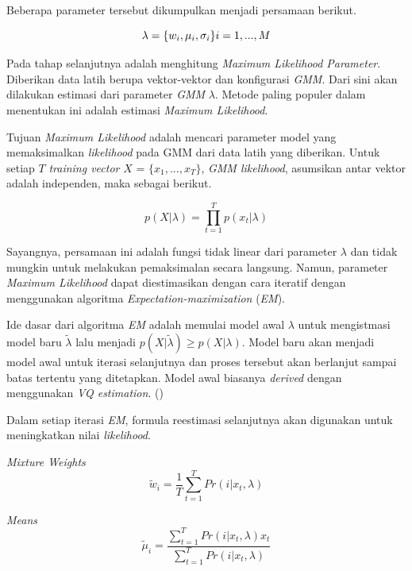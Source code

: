 Beberapa parameter tersebut dikumpulkan menjadi persamaan berikut.

\begin{equation}
    \label{eq:lambda_gaussian_mixture_model}
    \lambda = \{w_i, \mu_i, \sigma_i\} \\
    i = 1, ..., M
\end{equation}

Pada tahap selanjutnya adalah menghitung \textit{Maximum Likelihood Parameter}. Diberikan data latih berupa vektor-vektor dan konfigurasi \textit{GMM}. Dari sini akan dilakukan estimasi dari parameter \textit{GMM} $\lambda$. Metode paling populer dalam menentukan ini adalah estimasi \textit{Maximum Likelihood}.

Tujuan \textit{Maximum Likelihood} adalah mencari parameter model yang memaksimalkan \textit{likelihood} pada GMM dari data latih yang diberikan. Untuk setiap $T$ \textit{training vector} $X$ = $\{x_1,...,x_T\}$, \textit{GMM likelihood}, asumsikan antar vektor adalah independen, maka sebagai berikut.

\begin{equation}
    \label{eq:gmm_likelihood}
    p(X|\lambda) = \prod_{t=1}^{T} p(x_t|\lambda)
\end{equation}

Sayangnya, persamaan ini adalah fungsi tidak linear dari parameter $\lambda$ dan tidak mungkin untuk melakukan pemaksimalan secara langsung. Namun, parameter \textit{Maximum Likelihood} dapat diestimasikan dengan cara iteratif dengan menggunakan algoritma \textit{Expectation-maximization} (\textit{EM}).

Ide dasar dari algoritma \textit{EM} adalah memulai model awal $\lambda$ untuk mengistmasi model baru $\tilde{\lambda}$ lalu menjadi $p(X|\tilde{\lambda}) \geq p(X|\lambda)$. Model baru akan menjadi model awal untuk iterasi selanjutnya dan proses tersebut akan berlanjut sampai batas tertentu yang ditetapkan. Model awal biasanya \textit{derived} dengan menggunakan \textit{VQ estimation}. (\cite{reynolds_gaussian_mixture_model})

Dalam setiap iterasi \textit{EM}, formula reestimasi selanjutnya akan digunakan untuk meningkatkan nilai \textit{likelihood}.

\textit{Mixture Weights}
\begin{equation}
    \label{eq:gmm_em_mixture_weight}
    \tilde{w}_i = \frac{1}{T} \sum_{t=1}^{T}Pr(i|x_t, \lambda)
\end{equation}

\textit{Means}
\begin{equation}
    \label{eq:gmm_em_means}
    \tilde{\mu}_i = \frac{\sum_{t=1}^{T}Pr(i|x_t, \lambda) x_t}{\sum_{t=1}^{T}Pr(i|x_t, \lambda)} 
\end{equation}

